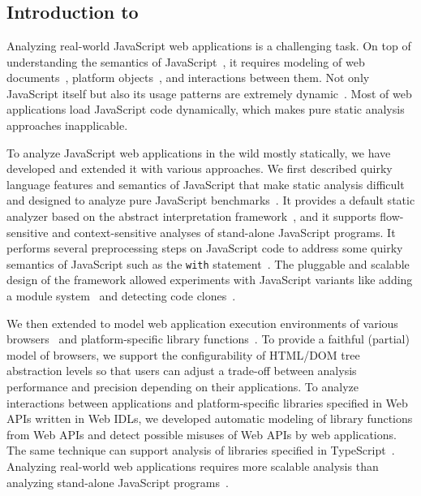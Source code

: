 \chapter{\safe}

\section{Introduction to }
\label{s:2:1:safe1}
Analyzing real-world JavaScript web applications is a challenging task.
On top of understanding the semantics of JavaScript~\cite{ecma5},
it requires modeling of web documents~\cite{W3C}, platform objects~\cite{tizen},
and interactions between them.
Not only JavaScript itself but also its usage patterns are extremely dynamic~\cite{dynamic,eval}.
Most of web applications load JavaScript code dynamically,
which makes pure static analysis approaches inapplicable.

To analyze JavaScript web applications in the wild mostly statically,
we have developed \safe and extended it with various approaches.
We first described quirky language features and semantics of JavaScript
that make static analysis difficult and designed \safe to analyze pure JavaScript
benchmarks~\cite{fool12}.  It provides a default static analyzer based on
the abstract interpretation framework~\cite{ai77},
and it supports flow-sensitive and context-sensitive analyses of stand-alone JavaScript programs.
It performs several preprocessing steps on JavaScript code
to address some quirky semantics of JavaScript such as
the \texttt{with} statement~\cite{dls13}.
The pluggable and scalable design of the framework allowed experiments with JavaScript variants
like adding a module system~\cite{oopsla12,modularity14}
and detecting code clones~\cite{emse16}.


We then extended \safe
to model web application execution environments of various browsers~\cite{ase15a} and
platform-specific library functions~\cite{fse14,safets}.  To provide a faithful (partial) model of browsers,
we support the configurability of HTML/DOM tree abstraction levels 
so that users can adjust a trade-off between analysis performance and precision 
depending on their applications.  To analyze interactions between applications
and platform-specific libraries specified in Web APIs written in Web IDLs,
we developed automatic modeling
of library functions from Web APIs and detect possible misuses of Web APIs
by web applications.  The same technique can support analysis of libraries specified
in TypeScript~\cite{ts}.  Analyzing real-world web applications requires
more scalable analysis than analyzing stand-alone JavaScript programs~\cite{ase15b,ecoop15}.


